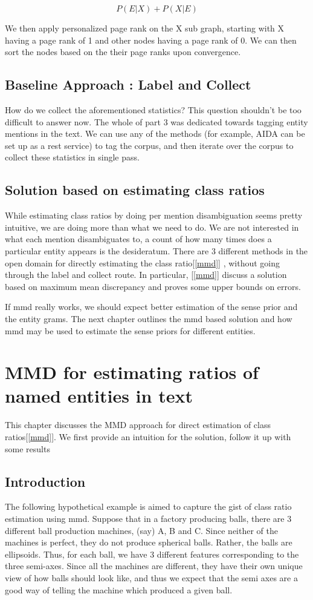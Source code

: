 \begin{equation}
\tag{3}
 P(E|X) + P(X|E) 
\end{equation}

We then apply personalized page rank on the X sub graph, starting with X having a 
page rank of 1 and other nodes having a page rank of 0. We can then sort the nodes
based on the their page ranks upon convergence. 
 


\section{Baseline Approach : Label and Collect}
How do we collect the aforementioned statistics?
This question shouldn't be too difficult to answer now. The whole of part 3
was dedicated towards tagging entity mentions in the text. We can use any of the 
methods (for example, AIDA can be set up as a rest service) to tag the corpus, and then iterate over the corpus to collect these statistics
in single pass. 
\section{Solution based on estimating class ratios}
While estimating class ratios by doing per mention disambiguation seems pretty intuitive, we are doing more than what we need to do.
We are not interested in what each mention disambiguates to, a count of how many times does a particular entity appears
is the desideratum. There are 3 different methods in the open domain for directly estimating the class ratio[\ref{mmd}] 
, without going through the label and collect route. In particular, [\ref{mmd}] discuss a solution based on maximum mean 
discrepancy and proves some upper bounds on errors. 

If mmd really works, we should expect better estimation of the sense prior and the entity grams. The next chapter outlines the mmd based 
solution and how mmd may be used to estimate the sense priors for different entities. 

\chapter{MMD for estimating ratios of named entities in text}
This chapter discusses the MMD approach for direct estimation of class ratios[\ref{mmd}]. We first provide an intuition for the 
solution, follow it up with some results 
\section{Introduction}
The following hypothetical example is aimed to capture the gist of class ratio estimation using mmd.
Suppose that in a factory producing balls, there are 3 different ball production machines, (say) A, B and C.
Since neither of the machines is perfect, they do not produce spherical balls. Rather, the balls are
ellipsoids. Thus, for each ball, we have 3 different features corresponding to the three semi-axes. 
Since all the machines are different, they have their own unique view of how balls should look like, 
and thus we expect that the semi axes are a good way of telling the machine which produced a given ball.

